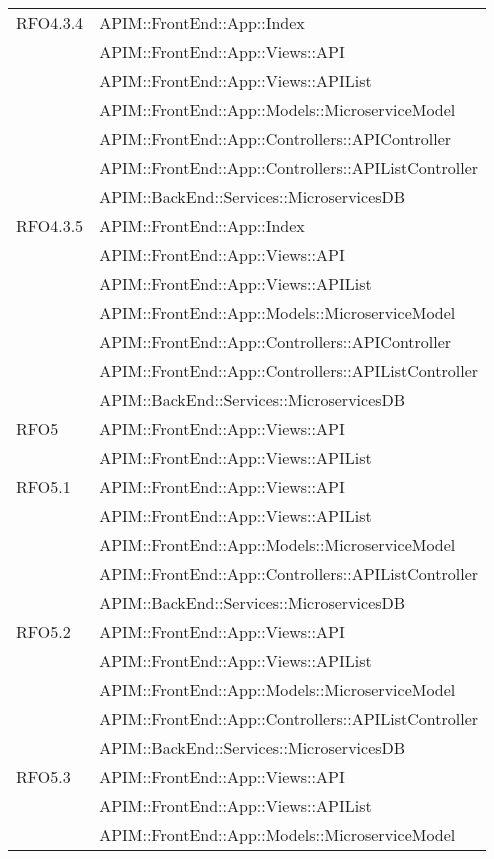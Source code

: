 \begin{longtable}{ p{4cm} | p{12cm} }
	\hline		
	RFO4.3.4
	& APIM::FrontEnd::App::Index \\
	& APIM::FrontEnd::App::Views::API \\
	& APIM::FrontEnd::App::Views::APIList \\
	& APIM::FrontEnd::App::Models::MicroserviceModel \\
	& APIM::FrontEnd::App::Controllers::APIController \\
	& APIM::FrontEnd::App::Controllers::APIListController \\
	& APIM::BackEnd::Services::MicroservicesDB \\
	\hline		
	RFO4.3.5
	& APIM::FrontEnd::App::Index \\
	& APIM::FrontEnd::App::Views::API \\
	& APIM::FrontEnd::App::Views::APIList \\
	& APIM::FrontEnd::App::Models::MicroserviceModel \\
	& APIM::FrontEnd::App::Controllers::APIController \\
	& APIM::FrontEnd::App::Controllers::APIListController \\
	& APIM::BackEnd::Services::MicroservicesDB \\
	\hline		
	RFO5
	& APIM::FrontEnd::App::Views::API \\
	& APIM::FrontEnd::App::Views::APIList \\
	\hline		
	RFO5.1
	& APIM::FrontEnd::App::Views::API \\
	& APIM::FrontEnd::App::Views::APIList \\
	& APIM::FrontEnd::App::Models::MicroserviceModel \\
	& APIM::FrontEnd::App::Controllers::APIListController \\
	& APIM::BackEnd::Services::MicroservicesDB \\
	\hline		
	RFO5.2
	& APIM::FrontEnd::App::Views::API \\
	& APIM::FrontEnd::App::Views::APIList \\
	& APIM::FrontEnd::App::Models::MicroserviceModel \\
	& APIM::FrontEnd::App::Controllers::APIListController \\
	& APIM::BackEnd::Services::MicroservicesDB \\
	\hline		
	RFO5.3
	& APIM::FrontEnd::App::Views::API \\
	& APIM::FrontEnd::App::Views::APIList \\
	& APIM::FrontEnd::App::Models::MicroserviceModel \\

\end{longtable}
